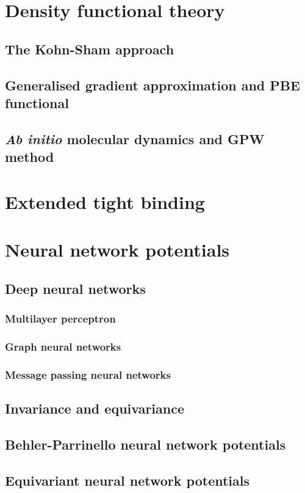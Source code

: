 \section{Density functional theory}

\subsection{The Kohn-Sham approach}

\subsection{Generalised gradient approximation and PBE functional}

\subsection{\textit{Ab initio} molecular dynamics and GPW method}



\section{Extended tight binding}



\section{Neural network potentials}

\subsection{Deep neural networks}

\subsubsection{Multilayer perceptron}

\subsubsection{Graph neural networks}

\subsubsection{Message passing neural networks}

\subsection{Invariance and equivariance}

\subsection{Behler-Parrinello neural network potentials}

\subsection{Equivariant neural network potentials}